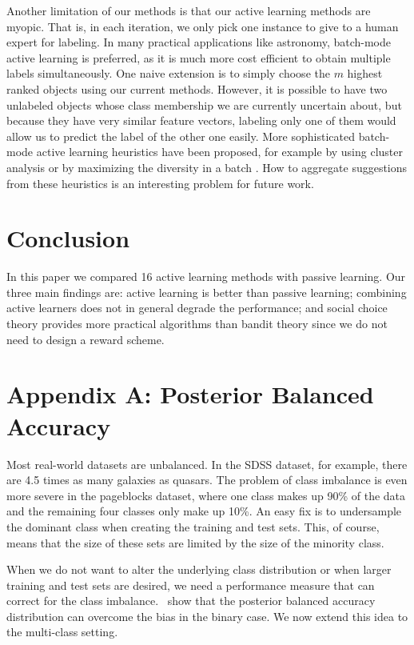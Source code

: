 \documentclass[fleqn,10pt,lineno]{wlpeerj} %
\begin{document}
Another limitation of our methods is that our active learning methods are
myopic. That is, in each iteration, we only pick one instance to give to a
human expert for labeling. In many practical applications like astronomy,
batch-mode active learning is preferred, as it is much more cost efficient to
obtain multiple labels simultaneously. One naive extension is to simply choose
the $m$ highest ranked objects using our current methods. However, it is
possible to have two unlabeled objects whose class membership we are currently
uncertain about, but because they have very similar feature vectors, labeling
only one of them would allow us to predict the label of the other one easily.
More sophisticated batch-mode active learning heuristics have been proposed,
for example by using cluster analysis \citep{xu07} or by maximizing the
diversity in a batch \citep{brinker03}. How to aggregate suggestions from these
heuristics is an interesting problem for future work.

\section{Conclusion}

In this paper we compared 16 active learning methods with passive learning.
Our three main findings are: active learning is better than passive learning;
combining active learners does not in general degrade the performance; and
social choice theory provides more practical algorithms than bandit theory
since we do not need to design a reward scheme.




\pagebreak

\section*{Appendix A: Posterior Balanced Accuracy}


Most real-world datasets are unbalanced. In the SDSS dataset, for example,
there are 4.5 times as many galaxies as quasars. The problem of class imbalance
is even more severe in the pageblocks dataset, where one class makes up 90\% of
the data and the remaining four classes only make up 10\%. An easy fix is to
undersample the dominant class when creating the training and test sets. This,
of course, means that the size of these sets are limited by the size of the
minority class.

When we do not want to alter the underlying class distribution or when larger
training and test sets are desired, we need a performance measure that can
correct for the class imbalance.~\cite{brodersen10} show that the posterior
balanced accuracy distribution can overcome the bias in the binary case. We now
extend this idea to the multi-class setting.
\end{document}

